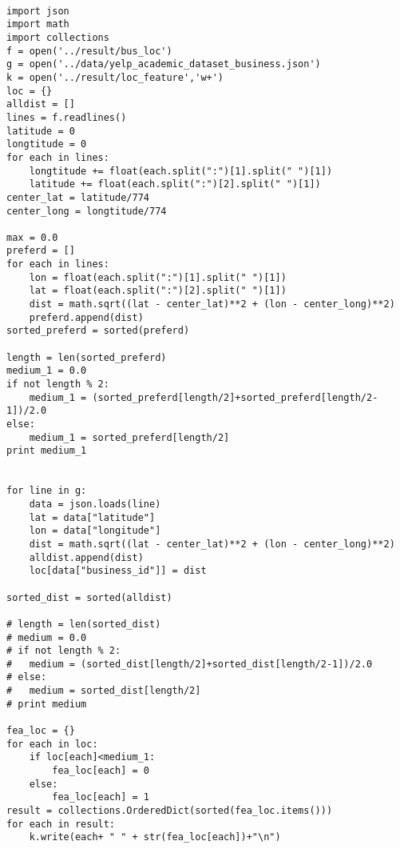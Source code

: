 \documentclass[11pt,letterpaper]{article}
\begin{document}
\clearpage
\lstset{language=Python,basicstyle=\footnotesize}
\begin{lstlisting}

import json
import math
import collections
f = open('../result/bus_loc')
g = open('../data/yelp_academic_dataset_business.json')
k = open('../result/loc_feature','w+')
loc = {}
alldist = []
lines = f.readlines()
latitude = 0
longtitude = 0
for each in lines:
	longtitude += float(each.split(":")[1].split(" ")[1])
	latitude += float(each.split(":")[2].split(" ")[1])
center_lat = latitude/774
center_long = longtitude/774

max = 0.0
preferd = []
for each in lines:
	lon = float(each.split(":")[1].split(" ")[1])
	lat = float(each.split(":")[2].split(" ")[1])
	dist = math.sqrt((lat - center_lat)**2 + (lon - center_long)**2)
	preferd.append(dist)
sorted_preferd = sorted(preferd)

length = len(sorted_preferd)
medium_1 = 0.0
if not length % 2:
	medium_1 = (sorted_preferd[length/2]+sorted_preferd[length/2-1])/2.0
else:
	medium_1 = sorted_preferd[length/2]
print medium_1


for line in g:
	data = json.loads(line)
	lat = data["latitude"]
	lon = data["longitude"]
	dist = math.sqrt((lat - center_lat)**2 + (lon - center_long)**2)
	alldist.append(dist)
	loc[data["business_id"]] = dist

sorted_dist = sorted(alldist)

# length = len(sorted_dist)
# medium = 0.0
# if not length % 2:
# 	medium = (sorted_dist[length/2]+sorted_dist[length/2-1])/2.0
# else:
# 	medium = sorted_dist[length/2]
# print medium

fea_loc = {}
for each in loc:
	if loc[each]<medium_1:
		fea_loc[each] = 0
	else:
		fea_loc[each] = 1
result = collections.OrderedDict(sorted(fea_loc.items()))
for each in result:
	k.write(each+ " " + str(fea_loc[each])+"\n")
\end{lstlisting}
\end{document}
